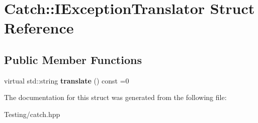 \hypertarget{struct_catch_1_1_i_exception_translator}{\section{Catch\-:\-:I\-Exception\-Translator Struct Reference}
\label{struct_catch_1_1_i_exception_translator}
}
\subsection*{Public Member Functions}
\begin{DoxyCompactItemize}
\item 
\hypertarget{struct_catch_1_1_i_exception_translator_ade89aa305d8c89576521e76b2d1f82eb}{virtual std\-::string {\bfseries translate} () const =0}\label{struct_catch_1_1_i_exception_translator_ade89aa305d8c89576521e76b2d1f82eb}

\end{DoxyCompactItemize}


The documentation for this struct was generated from the following file\-:\begin{DoxyCompactItemize}
\item 
Testing/catch.\-hpp\end{DoxyCompactItemize}
